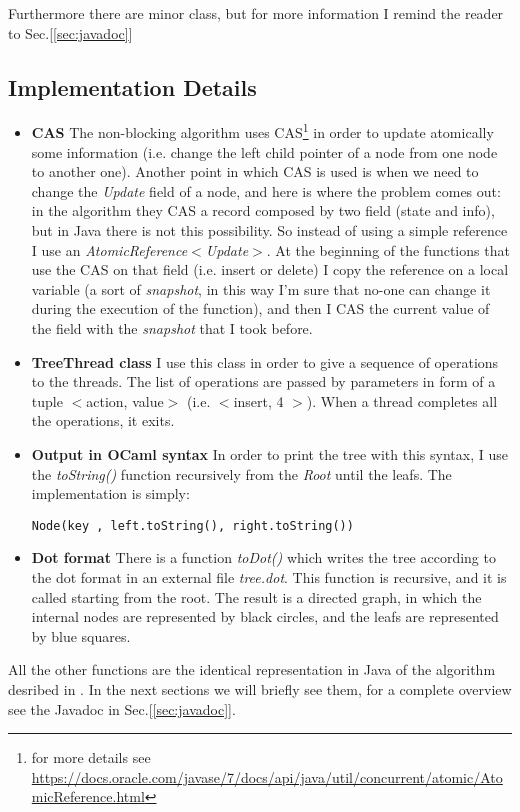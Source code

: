 \documentclass[a4paper]{article}
\begin{document}
\noindent

Furthermore there are minor class, but for more information I remind the reader to Sec.[\ref{sec:javadoc}]

\subsection{Implementation Details}
\label{subsec:implementation_details}
\begin{itemize}
  \item \textbf{\ac{CAS}} The non-blocking algorithm uses \ac{CAS}\footnote{for more details see \url{https://docs.oracle.com/javase/7/docs/api/java/util/concurrent/atomic/AtomicReference.html}} in order to update atomically some information (i.e. change the left child pointer of a node from one node to another one). Another point in which \ac{CAS} is used is when we need to change the \emph{Update} field of a node, and here is where the problem comes out: in the algorithm they \ac{CAS} a record composed by two field (state and info), but in Java there is not this possibility. So instead of using a simple reference I use an \emph{AtomicReference$<$Update$>$}. At the beginning of the functions that use the \ac{CAS} on that field (i.e. insert or delete) I copy the reference on a local variable (a sort of \emph{snapshot}, in this way I'm sure that no-one can change it during the execution of the function), and then I \ac{CAS} the current value of the field with the \emph{snapshot} that I took before.
  \item \textbf{TreeThread class} I use this class in order to give a sequence of operations to the threads. The list of operations are passed by parameters in form of a tuple $<$action, value$>$ (i.e. $<$insert, 4 $>$). When a thread completes all the operations, it exits.
  \item \textbf{Output in OCaml syntax} In order to print the tree with this syntax, I use the \emph{toString()} function recursively from the \emph{Root} until the leafs. The implementation is simply:

  \verb|Node(key , left.toString(), right.toString())|
  \item \textbf{Dot format} There is a function \emph{toDot()} which writes the tree according to the dot format in an external file \emph{tree.dot}. This function is recursive, and it is called starting from the root. The result is a directed graph, in which the internal nodes are represented by black circles, and the leafs are represented by blue squares.
\end{itemize}
\noindent
All the other functions are the identical representation in Java of the algorithm desribed in \cite{algorithm}. In the next sections we will briefly see them, for a complete overview see the Javadoc in Sec.[\ref{sec:javadoc}]. 
\end{document}
